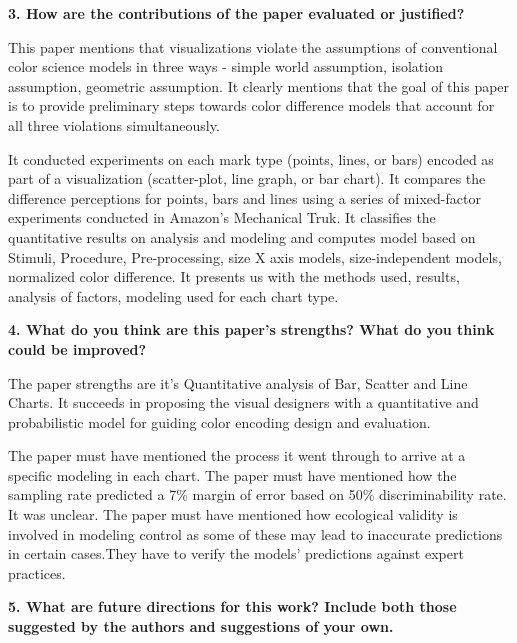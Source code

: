 \documentclass{article}[12pt]
\begin{document}
\vspace{2ex}\noindent
{\bf 3. How are the contributions of the paper evaluated or justified? }

{
	This paper mentions that visualizations violate the assumptions of conventional color science models in three ways -  simple world assumption, isolation assumption, geometric assumption. It clearly mentions that the goal
    of this paper is to provide preliminary steps towards color difference models that account for all three violations simultaneously.
    
    It conducted experiments on each mark type (points, lines, or bars) encoded as part of a visualization (scatter-plot, line graph, or bar chart). It compares the difference perceptions for points, bars and lines using a series of mixed-factor experiments conducted in Amazon's Mechanical Truk. It classifies the quantitative results on analysis and modeling and computes model based on Stimuli, Procedure, Pre-processing, size X axis models, size-independent models, normalized color difference. It presents us with the methods used, results, analysis of factors, modeling used for each chart type.

}




\vspace{2ex}\noindent
{ \bf 4. What do you think are this paper's strengths? What do you think could be
   improved? }

{
	The paper strengths are it's Quantitative analysis of Bar, Scatter and Line Charts. It succeeds in proposing the visual designers with a quantitative and probabilistic model for guiding color encoding design and evaluation.
	
	The paper must have mentioned the process it went through to arrive at a specific modeling in each chart. The paper must have mentioned how the sampling rate predicted a 7\% margin of error based on 50\% discriminability rate. It was unclear. The paper must have mentioned how ecological validity is involved in modeling control as some of these may lead to inaccurate predictions in certain cases.They have to verify the models’ predictions against expert practices.

}


\vspace{2ex}\noindent
{\bf 5. What are future directions for this work? Include both those suggested by
   the authors and suggestions of your own.}
\end{document}
